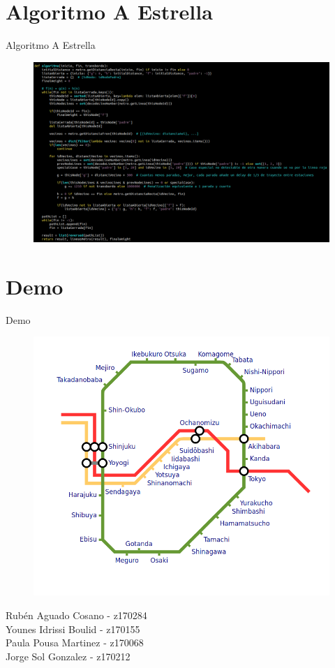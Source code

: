 \documentclass{beamer}
\begin{document}
\section{Algoritmo A Estrella}
\begin{frame}{Algoritmo A Estrella}
  \begin{figure}[H]
    \centering
    \includegraphics[scale=0.23]{"../pics/aEstrella"}
  \end{figure}
\end{frame}

\section{Demo}
\begin{frame}{Demo}
  \begin{figure}[H]
    \centering
    \includegraphics[scale=0.25]{"../pics/web"}
  \end{figure}

  \begin{center}
    {\ssmall Rubén Aguado Cosano - z170284 \\ 
      Younes Idrissi Boulid - z170155 \\ 
      Paula Pousa Martinez - z170068 \\ 
      Jorge Sol Gonzalez - z170212 \\
    }
  \end{center}
\end{frame}

\end{document}
